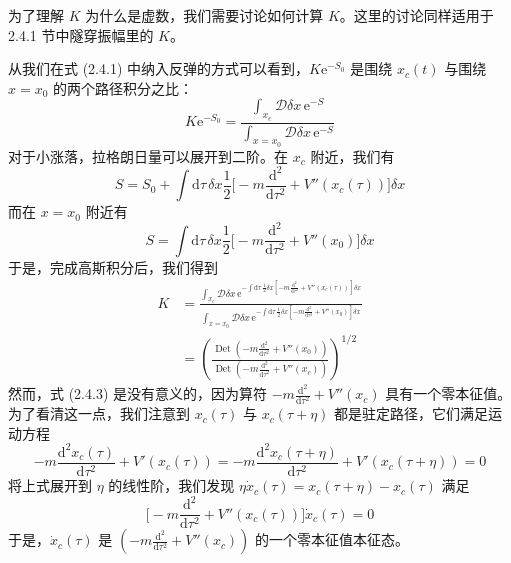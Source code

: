 为了理解 $K$ 为什么是虚数，我们需要讨论如何计算 $K$。这里的讨论同样适用于 2.4.1 节中隧穿振幅里的 $K$。

从我们在式 (2.4.1) 中纳入反弹的方式可以看到，$K\mathrm{e}^{-S_0}$ 是围绕 $x_c(t)$ 与围绕 $x = x_0$ 的两个路径积分之比：
\begin{equation*}
K\mathrm{e}^{-S_0} = \frac{\int_{x_c} \mathcal{D}\delta x\, \mathrm{e}^{-S}}{\int_{x=x_0} \mathcal{D}\delta x\, \mathrm{e}^{-S}}\tag{2.4.2}
\end{equation*}
对于小涨落，拉格朗日量可以展开到二阶。在 $x_c$ 附近，我们有
\begin{equation*}
S = S_0 + \int \mathrm{d}\tau\, \delta x \frac{1}{2}\Big[-m\frac{\mathrm{d}^2}{\mathrm{d}\tau^2} + V''(x_c(\tau))\Big]\delta x
\end{equation*}
而在 $x = x_0$ 附近有
\begin{equation*}
S = \int \mathrm{d}\tau\, \delta x \frac{1}{2}\Big[-m\frac{\mathrm{d}^2}{\mathrm{d}\tau^2} + V''(x_0)\Big]\delta x
\end{equation*}
于是，完成高斯积分后，我们得到
\begin{align*}
K &= \frac{\int_{x_c} \mathcal{D}\delta x\, \mathrm{e}^{-\int \mathrm{d}\tau\, \frac{1}{2}\delta x[-m\frac{\mathrm{d}^2}{\mathrm{d}\tau^2} + V''(x_c(\tau))]\delta x}}{\int_{x=x_0} \mathcal{D}\delta x\, \mathrm{e}^{-\int \mathrm{d}\tau\, \frac{1}{2}\delta x[-m\frac{\mathrm{d}^2}{\mathrm{d}\tau^2} + V''(x_0)]\delta x}} \\
&= \left(\frac{\operatorname{Det}\left(-m\frac{\mathrm{d}^2}{\mathrm{d}\tau^2} + V''(x_0)\right)}{\operatorname{Det}\left(-m\frac{\mathrm{d}^2}{\mathrm{d}\tau^2} + V''(x_c)\right)}\right)^{1/2}\tag{2.4.3}
\end{align*}
然而，式 (2.4.3) 是没有意义的，因为算符 $-m\frac{\mathrm{d}^2}{\mathrm{d}\tau^2} + V''(x_c)$ 具有一个零本征值。为了看清这一点，我们注意到 $x_c(\tau)$ 与 $x_c(\tau + \eta)$ 都是驻定路径，它们满足运动方程
\begin{equation*}
-m\frac{\mathrm{d}^2 x_c(\tau)}{\mathrm{d}\tau^2} + V'(x_c(\tau)) = -m\frac{\mathrm{d}^2 x_c(\tau+\eta)}{\mathrm{d}\tau^2} + V'(x_c(\tau+\eta)) = 0
\end{equation*}
将上式展开到 $\eta$ 的线性阶，我们发现 $\eta\dot{x}_c(\tau) = x_c(\tau+\eta) - x_c(\tau)$ 满足
\begin{equation*}
\Big[-m\frac{\mathrm{d}^2}{\mathrm{d}\tau^2} + V''(x_c(\tau))\Big]\dot{x}_c(\tau) = 0
\end{equation*}
于是，$\dot{x}_c(\tau)$ 是 $\left(-m\frac{\mathrm{d}^2}{\mathrm{d}\tau^2} + V''(x_c)\right)$ 的一个零本征值本征态。


